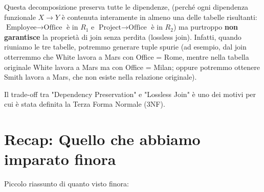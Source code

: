 \noindent Questa decomposizione preserva tutte le dipendenze, (perché ogni dipendenza funzionale $X \rightarrow Y$ è contenuta interamente in almeno una delle tabelle risultanti: $\text{Employee} \rightarrow \text{Office}$ è in $R_1$ e $\text{Project} \rightarrow \text{Office}$ è in $R_2$) ma purtroppo \textbf{non garantisce} la proprietà di join senza perdita (lossless join). Infatti, quando riuniamo le tre tabelle, potremmo generare tuple spurie (ad esempio, dal join otterremmo che White lavora a Mars con Office = Rome, mentre nella tabella originale White lavora a Mars ma con Office = Milan; oppure potremmo ottenere Smith lavora a Mars, che non esiste nella relazione originale).

\noindent Il trade-off tra "Dependency Preservation" e "Lossless Join" è uno dei motivi per cui è stata definita la Terza Forma Normale (3NF).

\section{Recap: Quello che abbiamo imparato finora}

Piccolo riassunto di quanto visto finora:

